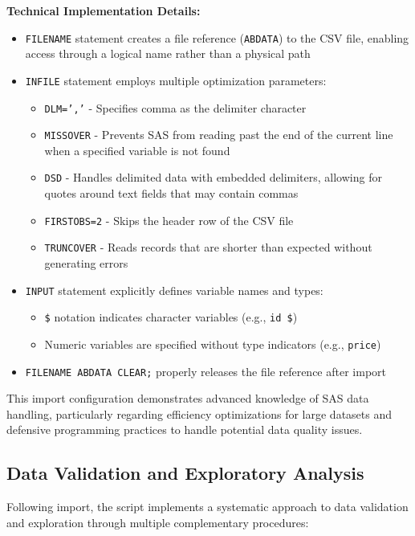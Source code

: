 \documentclass{article}
\begin{document}
\noindent
\textbf{Technical Implementation Details:}
\begin{itemize}[leftmargin=*]
    \item \texttt{FILENAME} statement creates a file reference (\texttt{ABDATA}) to the CSV file, enabling access through a logical name rather than a physical path
    \item \texttt{INFILE} statement employs multiple optimization parameters:
    \begin{itemize}
        \item \texttt{DLM=','} - Specifies comma as the delimiter character
        \item \texttt{MISSOVER} - Prevents SAS from reading past the end of the current line when a specified variable is not found
        \item \texttt{DSD} - Handles delimited data with embedded delimiters, allowing for quotes around text fields that may contain commas
        \item \texttt{FIRSTOBS=2} - Skips the header row of the CSV file
        \item \texttt{TRUNCOVER} - Reads records that are shorter than expected without generating errors
    \end{itemize}
    \item \texttt{INPUT} statement explicitly defines variable names and types:
    \begin{itemize}
        \item \texttt{\$} notation indicates character variables (e.g., \texttt{id \$})
        \item Numeric variables are specified without type indicators (e.g., \texttt{price})
    \end{itemize}
    \item \texttt{FILENAME ABDATA CLEAR;} properly releases the file reference after import
\end{itemize}

This import configuration demonstrates advanced knowledge of SAS data handling, particularly regarding efficiency optimizations for large datasets and defensive programming practices to handle potential data quality issues.

\subsection{Data Validation and Exploratory Analysis}
Following import, the script implements a systematic approach to data validation and exploration through multiple complementary procedures:
\end{document}
